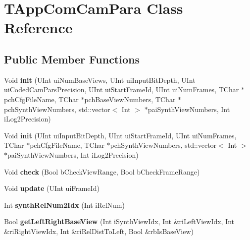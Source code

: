 \hypertarget{class_t_app_com_cam_para}{}\section{T\+App\+Com\+Cam\+Para Class Reference}
\label{class_t_app_com_cam_para}
\subsection*{Public Member Functions}
\begin{DoxyCompactItemize}
\item 
\mbox{\label{class_t_app_com_cam_para_a8a242088adae8e94a2b8e1a0f99cd219}} 
Void {\bfseries init} (U\+Int ui\+Num\+Base\+Views, U\+Int ui\+Input\+Bit\+Depth, U\+Int ui\+Coded\+Cam\+Pars\+Precision, U\+Int ui\+Start\+Frame\+Id, U\+Int ui\+Num\+Frames, T\+Char $\ast$pch\+Cfg\+File\+Name, T\+Char $\ast$pch\+Base\+View\+Numbers, T\+Char $\ast$pch\+Synth\+View\+Numbers, std\+::vector$<$ Int $>$ $\ast$pai\+Synth\+View\+Numbers, Int i\+Log2\+Precision)
\item 
\mbox{\label{class_t_app_com_cam_para_a9dd336d322b2be6e9e871e7ca966f093}} 
Void {\bfseries init} (U\+Int ui\+Input\+Bit\+Depth, U\+Int ui\+Start\+Frame\+Id, U\+Int ui\+Num\+Frames, T\+Char $\ast$pch\+Cfg\+File\+Name, T\+Char $\ast$pch\+Synth\+View\+Numbers, std\+::vector$<$ Int $>$ $\ast$pai\+Synth\+View\+Numbers, Int i\+Log2\+Precision)
\item 
\mbox{\label{class_t_app_com_cam_para_ac6c146fcd2aba624ce92f9c71f50462f}} 
Void {\bfseries check} (Bool b\+Check\+View\+Range, Bool b\+Check\+Frame\+Range)
\item 
\mbox{\label{class_t_app_com_cam_para_a02836a9d44b43fc7f40feef15407d49f}} 
Void {\bfseries update} (U\+Int ui\+Frame\+Id)
\item 
\mbox{\label{class_t_app_com_cam_para_a84b02674d0bf631c9a01ba3810efebaf}} 
Int {\bfseries synth\+Rel\+Num2\+Idx} (Int i\+Rel\+Num)
\item 
\mbox{\label{class_t_app_com_cam_para_a28cfe00a4626a684e495c1d6201615b5}} 
Bool {\bfseries get\+Left\+Right\+Base\+View} (Int i\+Synth\+View\+Idx, Int \&ri\+Left\+View\+Idx, Int \&ri\+Right\+View\+Idx, Int \&ri\+Rel\+Dist\+To\+Left, Bool \&rb\+Is\+Base\+View)

\end{DoxyCompactItemize}
